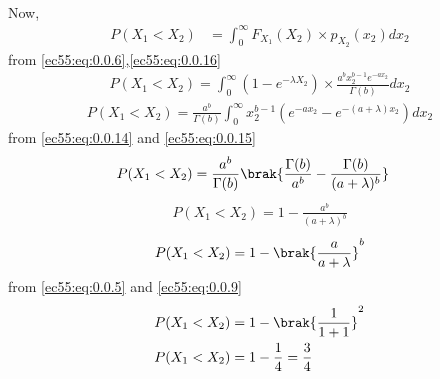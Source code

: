 \begin{enumerate}
\begin{align}
  \end{align}
  Now,
\begin{align}
      P(X_1<X_2)&=\int_{0}^\infty F_{X_1}(X_2) \times p_{X_2}(x_2)dx_2
      \end{align}
      from \eqref{ec55:eq:0.0.6},\eqref{ec55:eq:0.0.16}
  \begin{align}
     P(X_1<X_2)=\int_{0}^\infty (1-e^{-\lambda X_2})\times \frac{a^b x_2^{b-1}e^{-ax_2}}{\Gamma(b)} dx_2
     \end{align}
     \begin{align}
     P(X_1<X_2)=\frac{a^b}{\Gamma(b)}\int_{0}^\infty x_2^{b-1}(e^{-ax_2}-e^{-(a+\lambda)x_2})dx_2
  \end{align}
      from \eqref{ec55:eq:0.0.14} and \eqref{ec55:eq:0.0.15}
      \begin{align}
     P(X_1<X_2)&=\frac{a^b}{\Gamma(b)}\brak{\frac{\Gamma(b)}{a^b}-\frac{\Gamma(b)}{(a+\lambda)^b}}
     \end{align}
 \begin{align}
      P(X_1<X_2)=1-\frac{a^b}{(a+\lambda)^b}
 \end{align}
 \begin{align}
     P(X_1<X_2)=1-\brak{\frac{a}{a+\lambda}}^b
 \end{align}
 from \eqref{ec55:eq:0.0.5} and \eqref{ec55:eq:0.0.9}
 \begin{align}
     P(X_1<X_2)&=1-\brak{\frac{1}{1+1}}^2\\
     P(X_1<X_2)&=1-\frac{1}{4}=\frac{3}{4}
 \end{align}
\end{enumerate}
